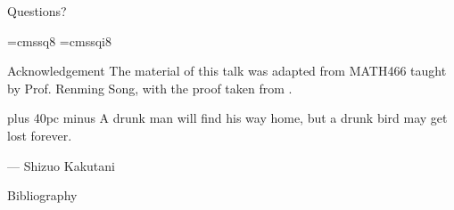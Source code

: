 \documentclass[aspectratio=169, handout]{beamer}
\begin{document}
\begin{frame}{}
      \begin{center}
    {\color{sigma@mainblue} \LARGE Questions?}
  \end{center}
\end{frame}

\font\eightss=cmssq8
\font\eightssi=cmssqi8
\newcommand\quoteAuthorDate[2]{\begingroup
  \baselineskip 10pt
  \parfillskip 0pt
  \interlinepenalty 10000 %
  \leftskip 0pt plus 40pc minus \parindent
  \let\rm=\eightss
  \let\sl=\eightssi
  \everypar{\sl}#1\par
  \nobreak\smallskip
  \noindent\rm--- #2\par
  \endgroup}
\begin{frame}{Acknowledgement}
    The material of this talk was adapted from MATH466 taught by Prof. Renming Song, with the proof taken from \cite{Norris_1997}.
\end{frame}

\begin{frame}
    \begin{center}
        \item \quoteAuthorDate{A drunk man will find his way home, but a drunk bird may get lost forever.}{Shizuo Kakutani}
    \end{center}
\end{frame}

\begin{frame}[allowframebreaks]{Bibliography}
    \tiny
    
    
\end{frame}
\end{document}
